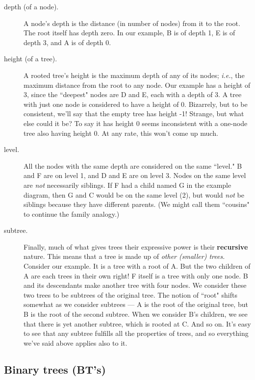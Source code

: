 \begin{description}
\item[depth (of a node).] A node's depth is the distance (in number of
nodes) from it to the root. The root itself has depth zero. In our example,
B is of depth 1, E is of depth 3, and A is of depth 0.

\item[height (of a tree).] A rooted tree's height is the maximum depth of
any of its nodes; \textit{i.e.}, the maximum distance from the root to any
node. Our example has a height of 3, since the ``deepest" nodes are D and
E, each with a depth of 3. A tree with just one node is considered to have
a height of 0. Bizarrely, but to be consistent, we'll say that the empty
tree has height -1! Strange, but what else could it be? To say it has
height 0 seems inconsistent with a one-node tree also having height 0. At
any rate, this won't come up much.

\item[level.] All the nodes with the same depth are considered on the same
``level." B and F are on level 1, and D and E are on level 3. Nodes on the
same level are \textit{not} necessarily siblings. If F had a child named G
in the example diagram, then G and C would be on the same level (2), but
would \textit{not} be siblings because they have different parents. (We
might call them ``cousins" to continue the family analogy.)

\item[subtree.] \label{recursion} Finally, much of what gives trees their
expressive power is their \textbf{recursive} nature. This means that a tree
is made up of \textit{other (smaller) trees.} Consider our example. It is a
tree with a root of A. But the two children of A are each trees in their
own right! F itself is a tree with only one node. B and its descendants
make another tree with four nodes. We consider these two trees to be
subtrees of the original tree. The notion of ``root" shifts somewhat as we
consider subtrees --- A is the root of the original tree, but B is the root
of the second subtree. When we consider B's children, we see that there is
yet another subtree, which is rooted at C. And so on. It's easy to see that
any subtree fulfills all the properties of trees, and so everything we've
said above applies also to it.

\end{description}

\subsection{Binary trees (BT's)}

